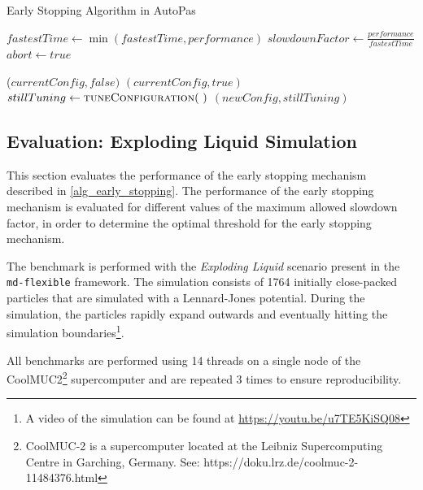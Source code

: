 \documentclass[conference]{IEEEtran}
\begin{document}
\begin{algorithm}[H]
    \small
    \caption{Early Stopping Algorithm in AutoPas}
    \label{alg_early_stopping}
    \begin{algorithmic}[1]
        \State $fastestTime \gets \min(fastestTime, performance)$
        \State $slowdownFactor \gets \frac{performance}{fastestTime}$
        \State $abort \gets true$
        \EndIf
        \EndProcedure

        \vspace{0.5em}

        \State \Return ($currentConfig, false)$
            \State \Return $(currentConfig, true)$
            \Else
            \State $stillTuning \gets \Call{tuneConfiguration}{~}$
            \State \Return $(newConfig, stillTuning)$
        \EndIf
        \EndProcedure
    \end{algorithmic}

\end{algorithm}



\subsection{Evaluation: Exploding Liquid Simulation}
\label{sec:evaluation}

This section evaluates the performance of the early stopping mechanism described in \autoref{alg_early_stopping}. The performance of the early stopping mechanism is evaluated for different values of the maximum allowed slowdown factor, in order to determine the optimal threshold for the early stopping mechanism.

The benchmark is performed with the \textit{Exploding Liquid} scenario present in the \texttt{md-flexible} framework. The simulation consists of 1764 initially close-packed particles that are simulated with a Lennard-Jones potential. During the simulation, the particles rapidly expand outwards and eventually hitting the simulation boundaries\footnote{A video of the simulation can be found at \url{https://youtu.be/u7TE5KiSQ08}}.

All benchmarks are performed using 14 threads on a single node of the CoolMUC2\footnote{CoolMUC-2 is a supercomputer located at the Leibniz Supercomputing Centre in Garching, Germany. See: https://doku.lrz.de/coolmuc-2-11484376.html} supercomputer and are repeated 3 times to ensure reproducibility.
\end{document}
